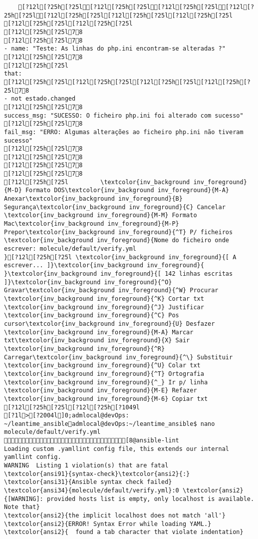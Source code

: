 \documentclass{scrartcl}
\begin{document}
\begin{Verbatim}
    [?12l[?25h[?25l[?12l[?25h[?25l[?12l[?25h[?25l[?12l[?25h[?25l[?12l[?25h[?25l[?12l[?25h[?25l[?12l[?25h[?25l
[?12l[?25h[?25l[?12l[?25h[?25l
[?12l[?25h[?25l78
[?12l[?25h[?25l78
- name: "Teste: As linhas do php.ini encontram-se alteradas ?"
[?12l[?25h[?25l78
[?12l[?25h[?25l
that:
[?12l[?25h[?25l[?12l[?25h[?25l[?12l[?25h[?25l[?12l[?25h[?25l78
- not estado.changed
[?12l[?25h[?25l78
success_msg: "SUCESSO: O ficheiro php.ini foi alterado com sucesso"
[?12l[?25h[?25l78
fail_msg: "ERRO: Algumas alterações ao ficheiro php.ini não tiveram sucesso"
[?12l[?25h[?25l78
[?12l[?25h[?25l78
[?12l[?25h[?25l78
[?12l[?25h[?25l78
[?12l[?25h[?25l         \textcolor{inv_background inv_foreground}{M-D} Formato DOS\textcolor{inv_background inv_foreground}{M-A} Anexar\textcolor{inv_background inv_foreground}{B} Segurança\textcolor{inv_background inv_foreground}{C} Cancelar           \textcolor{inv_background inv_foreground}{M-M} Formato Mac\textcolor{inv_background inv_foreground}{M-P} Prepor\textcolor{inv_background inv_foreground}{^T} P/ ficheiros
\textcolor{inv_background inv_foreground}{Nome do ficheiro onde escrever: molecule/default/verify.yml                                                                               }[?12l[?25h[?25l \textcolor{inv_background inv_foreground}{[ A escrever... ]}\textcolor{inv_background inv_foreground}{          }\textcolor{inv_background inv_foreground}{[ 142 linhas escritas ]}\textcolor{inv_background inv_foreground}{^O} Gravar\textcolor{inv_background inv_foreground}{^W} Procurar      \textcolor{inv_background inv_foreground}{^K} Cortar txt    \textcolor{inv_background inv_foreground}{^J} Justificar    \textcolor{inv_background inv_foreground}{^C} Pos cursor\textcolor{inv_background inv_foreground}{U} Desfazer     \textcolor{inv_background inv_foreground}{M-A} Marcar txt\textcolor{inv_background inv_foreground}{X} Sair    \textcolor{inv_background inv_foreground}{^R} Carregar\textcolor{inv_background inv_foreground}{^\} Substituir    \textcolor{inv_background inv_foreground}{^U} Colar txt     \textcolor{inv_background inv_foreground}{^T} Ortografia    \textcolor{inv_background inv_foreground}{^_} Ir p/ linha   \textcolor{inv_background inv_foreground}{M-E} Refazer      \textcolor{inv_background inv_foreground}{M-6} Copiar txt
[?12l[?25h[?25l[?12l[?25h[?1049l
[?1l>[?2004l]0;admlocal@devOps: ~/leantime_ansibleadmlocal@devOps:~/leantime_ansible$ nano molecule/default/verify.yml [8@ansible-lint
Loading custom .yamllint config file, this extends our internal yamllint config.
WARNING  Listing 1 violation(s) that are fatal
\textcolor{ansi91}{syntax-check}\textcolor{ansi2}{:} \textcolor{ansi31}{Ansible syntax check failed}
\textcolor{ansi34}{molecule/default/verify.yml}:0 \textcolor{ansi2}{[WARNING]: provided hosts list is empty, only localhost is available. Note that}
\textcolor{ansi2}{the implicit localhost does not match 'all'}
\textcolor{ansi2}{ERROR! Syntax Error while loading YAML.}
\textcolor{ansi2}{  found a tab character that violate indentation}


\end{Verbatim}
\end{document}
